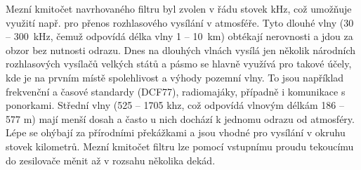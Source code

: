 Mezní kmitočet navrhovaného filtru byl zvolen v řádu stovek kHz, což umožňuje využití např. pro přenos rozhlasového vysílání v atmosféře. Tyto dlouhé vlny (30 -- 300~kHz, čemuž odpovídá délka vlny 1 -- 10~km) obtékají nerovnosti a jdou za obzor bez nutnosti odrazu. Dnes na dlouhých vlnách vysílá jen několik národních rozhlasových vysílačů velkých států a pásmo se hlavně využívá pro takové účely, kde je na prvním místě spolehlivost a výhody pozemní vlny. To jsou například frekvenční a časové standardy (DCF77), radiomajáky, případně i komunikace s ponorkami. Střední vlny (525 -- 1705 khz, což odpovídá vlnovým délkám 186 -- 577 m) mají menší dosah a často u nich dochází k jednomu odrazu od atmosféry. Lépe se ohýbají za přírodními překážkami a jsou vhodné pro vysílání v okruhu stovek kilometrů. Mezní kmitočet filtru lze pomocí vstupnímu proudu tekoucímu do zesilovače měnit až v rozsahu několika dekád. 
